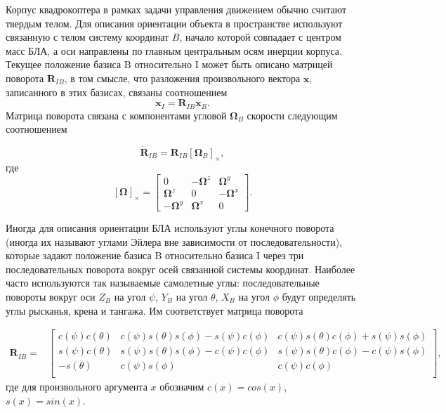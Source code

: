 Корпус квадрокоптера в рамках задачи управления движением обычно считают твердым телом. Для описания ориентации объекта в пространстве используют связанную с телом систему координат $B$, начало которой совпадает с центром масс БЛА, а оси направлены по главным центральным осям инерции корпуса. Текущее положение базиса B относительно I может быть описано матрицей поворота $\bm{R}_{IB}$, в том смысле, что разложения произвольного вектора $\bm{x}$, записанного в этих базисах, связаны соотношением
\begin{equation} \label{eq:rotmx}
\bm{x}_I = \bm{R}_{IB}\bm{x}_B.
\end{equation}
Матрица поворота связана с компонентами угловой $\bm{\Omega}_B$ скорости следующим соотношением

\begin{equation} \label{eq:angvel_rotmx}
\dot{\bm{R}}_{IB} = \bm{R}_{IB} [\bm{\Omega}_B]_{\times},
\end{equation}
где
\begin{equation} \label{eq:hat_operator}
[\bm{\Omega}]_{\times} =
\begin{bmatrix}
0            & -\bm{\Omega}^z   & \bm{\Omega}^y \\
\bm{\Omega}^z     & 0           &-\bm{\Omega}^x\\
-\bm{\Omega}^y    & \bm{\Omega}^x    & 0
\end{bmatrix}.
\end{equation}

Иногда для описания ориентации БЛА используют углы конечного поворота (иногда их называют углами Эйлера вне зависимости от последовательности), которые задают положение базиса B относительно базиса I через три  последовательных поворота вокруг осей связанной системы координат. Наиболее часто используются так называемые самолетные углы: последовательные повороты вокруг оси $Z_B$ на угол $\psi$, $Y_B$ на угол $\theta$, $X_B$ на угол $\phi$ будут определять углы рысканья, крена и тангажа. Им соответствует матрица поворота

\small
\begin{equation*} \label{eq:eul_to_rotmx}
\begin{aligned}
\bm{R}_{IB} =
&\begin{bmatrix}
c(\psi)c(\theta) & c(\psi)s(\theta)s(\phi) - s(\psi)c(\phi) & c(\psi)s(\theta)c(\phi) + s(\psi)s(\phi) \\
s(\psi)c(\theta) & s(\psi)s(\theta)s(\phi) - c(\psi)c(\phi) & s(\psi)s(\theta)c(\phi) - c(\psi)s(\phi) \\
-s(\theta)         & c(\psi)s(\phi)                                 & c(\psi)c(\phi)\\
\end{bmatrix},
\end{aligned}
\end{equation*}
\normalsize
где для произвольного аргумента $x$ обозначим $c(x) = cos(x)$, $s(x) = sin(x)$.

